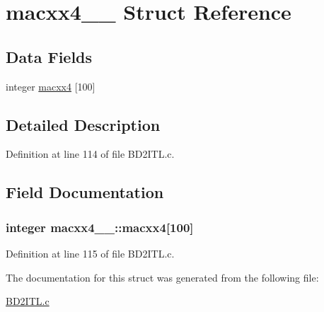\hypertarget{structmacxx4__1__}{}\section{macxx4\+\_\+\_\+ Struct Reference}
\label{structmacxx4__1__}
\subsection*{Data Fields}
\begin{DoxyCompactItemize}
\item 
integer \hyperlink{structmacxx4__1___ad23ffb4957cfaf43f2b715290e59706a}{macxx4} \mbox{[}100\mbox{]}
\end{DoxyCompactItemize}


\subsection{Detailed Description}


Definition at line 114 of file B\+D2\+I\+T\+L.\+c.



\subsection{Field Documentation}
\subsubsection[{\texorpdfstring{macxx4}{macxx4}}]{\setlength{\rightskip}{0pt plus 5cm}integer macxx4\+\_\+\_\+\+::macxx4\mbox{[}100\mbox{]}}\hypertarget{structmacxx4__1___ad23ffb4957cfaf43f2b715290e59706a}{}\label{structmacxx4__1___ad23ffb4957cfaf43f2b715290e59706a}


Definition at line 115 of file B\+D2\+I\+T\+L.\+c.



The documentation for this struct was generated from the following file\+:\begin{DoxyCompactItemize}
\item 
\hyperlink{BD2ITL_8c}{B\+D2\+I\+T\+L.\+c}\end{DoxyCompactItemize}
